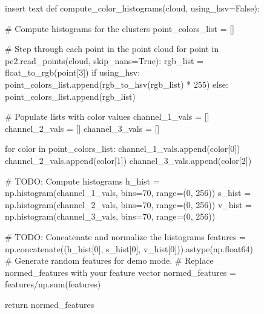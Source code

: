 \documentclass[a4paper]{article}
\begin{document}
\begin{figure}[h]\scriptsize
\begin{sexylisting}{insert text}
def compute_color_histograms(cloud, using_hsv=False):

	# Compute histograms for the clusters
	point_colors_list = []

	# Step through each point in the point cloud
	for point in pc2.read_points(cloud, skip_nans=True):
		rgb_list = float_to_rgb(point[3])
		if using_hsv:
			point_colors_list.append(rgb_to_hsv(rgb_list) * 255)
		else:
			point_colors_list.append(rgb_list)

	# Populate lists with color values
	channel_1_vals = []
	channel_2_vals = []
	channel_3_vals = []

	for color in point_colors_list:
		channel_1_vals.append(color[0])
		channel_2_vals.append(color[1])
		channel_3_vals.append(color[2])

	# TODO: Compute histograms
	h_hist = np.histogram(channel_1_vals, bins=70, range=(0, 256))
	s_hist = np.histogram(channel_2_vals, bins=70, range=(0, 256))
	v_hist = np.histogram(channel_3_vals, bins=70, range=(0, 256))

	# TODO: Concatenate and normalize the histograms
	features = np.concatenate((h_hist[0], s_hist[0], v_hist[0])).astype(np.float64)
	# Generate random features for demo mode.
	# Replace normed_features with your feature vector
	normed_features = features/np.sum(features)

	return normed_features		
\end{sexylisting}
\end{figure}

\newpage
\end{document}
